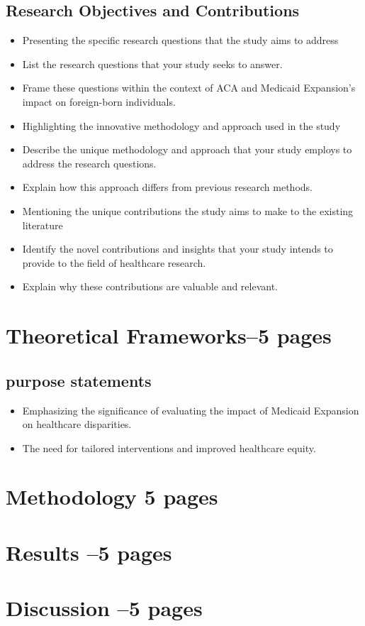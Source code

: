 \documentclass[10pt, oneside]{article}
\begin{document}
\subsection{Research Objectives and Contributions}

\begin{itemize}
\item Presenting the specific research questions that the study aims to address
\item List the research questions that your study seeks to answer.
\item Frame these questions within the context of ACA and Medicaid Expansion's impact on foreign-born individuals.
\item Highlighting the innovative methodology and approach used in the study
\item Describe the unique methodology and approach that your study employs to address the research questions.
\item Explain how this approach differs from previous research methods.
\item Mentioning the unique contributions the study aims to make to the existing literature
\item Identify the novel contributions and insights that your study intends to provide to the field of healthcare research.
\item Explain why these contributions are valuable and relevant.

\end{itemize}



\section{Theoretical Frameworks--5 pages}

\subsection{purpose statements}
\begin{itemize}
\item Emphasizing the significance of evaluating the impact of Medicaid Expansion on healthcare disparities.
\item The need for tailored interventions and improved healthcare equity.


\end{itemize}
\section{Methodology 5 pages}

\section{Results --5 pages}

\section{Discussion --5 pages}
\end{document}
